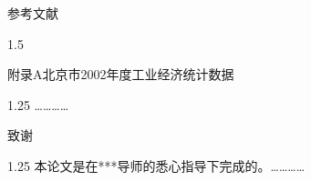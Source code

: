 \documentclass[a4paper,12pt]{ctexart}
\newcommand{\xiaoer}{\fontsize{18pt}{27pt}\selectfont}
\newcommand{\xiaosi}{\fontsize{12pt}{20pt}\selectfont}
\newcommand{\wuhao}{\fontsize{10.5pt}{15.75pt}\selectfont}
\numberwithin{equation}{section}
\begin{document}
\newpage

\begin{center}
  {\heiti\xiaoer 参考文献}
\end{center}

\vspace{0.5cm}

\begin{spacing}{1.5}
\wuhao
\printbibliography[heading=none]
\end{spacing}

\newpage

\begin{center}
  {\heiti\xiaoer 附录A\hspace{1em}北京市2002年度工业经济统计数据}
\end{center}

\vspace{0.5cm}

\begin{spacing}{1.25}
\xiaosi\songti
…………
\end{spacing}

\newpage

\begin{center}
  {\heiti\xiaoer 致\hspace{2em}谢}
\end{center}

\vspace{0.5cm}

\begin{spacing}{1.25}
\xiaosi\songti
本论文是在***导师的悉心指导下完成的。…………
\end{spacing}
\end{document}

